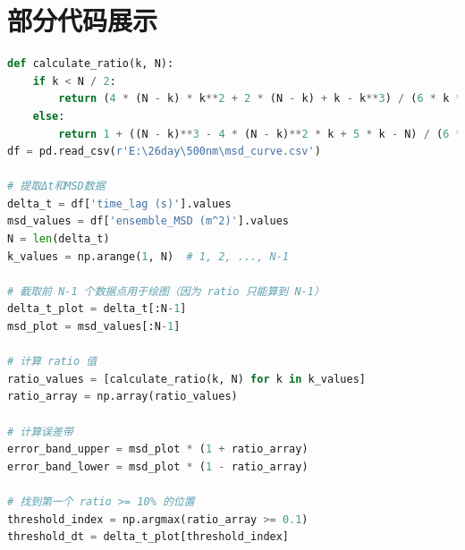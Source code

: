 \documentclass[a4paper]{report} %
\begin{document}
\section{部分代码展示}
\begin{lstlisting}[language=Python, caption=有效拟合区间的选取, label=code:calculate1]
def calculate_ratio(k, N):
    if k < N / 2:
        return (4 * (N - k) * k**2 + 2 * (N - k) + k - k**3) / (6 * k * (N - k)**2)
    else:
        return 1 + ((N - k)**3 - 4 * (N - k)**2 * k + 5 * k - N) / (6 * k**2 * (N - k))
df = pd.read_csv(r'E:\26day\500nm\msd_curve.csv')

# 提取Δt和MSD数据
delta_t = df['time_lag (s)'].values
msd_values = df['ensemble_MSD (m^2)'].values
N = len(delta_t)
k_values = np.arange(1, N)  # 1, 2, ..., N-1

# 截取前 N-1 个数据点用于绘图（因为 ratio 只能算到 N-1）
delta_t_plot = delta_t[:N-1]
msd_plot = msd_values[:N-1]

# 计算 ratio 值
ratio_values = [calculate_ratio(k, N) for k in k_values]
ratio_array = np.array(ratio_values)

# 计算误差带
error_band_upper = msd_plot * (1 + ratio_array)
error_band_lower = msd_plot * (1 - ratio_array)

# 找到第一个 ratio >= 10% 的位置
threshold_index = np.argmax(ratio_array >= 0.1)
threshold_dt = delta_t_plot[threshold_index]
\end{lstlisting}
\end{document}
